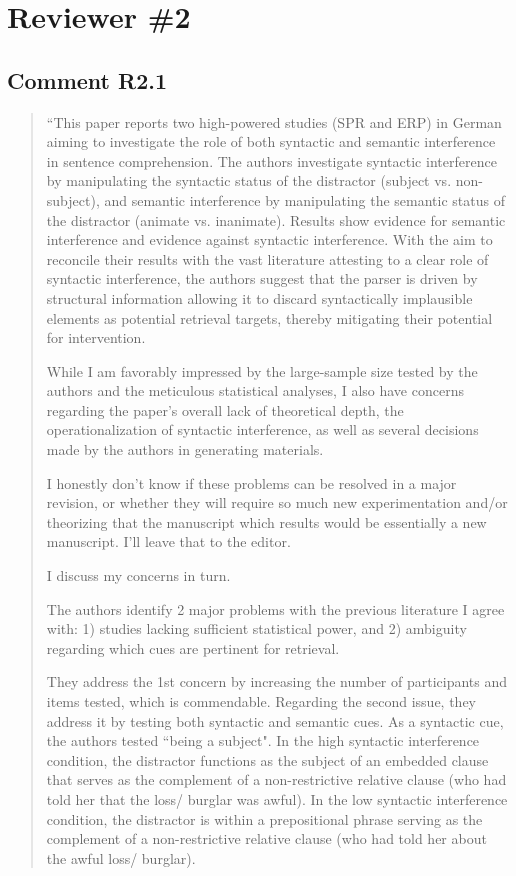 \documentclass[12pt]{article}
\begin{document}
\section*{Reviewer \#2} 
\subsection*{Comment R2.1}
\begin{quote}
``This paper reports two high-powered studies (SPR and ERP) in German aiming to investigate the role of both syntactic and semantic interference in sentence comprehension. The authors investigate syntactic interference by manipulating the syntactic status of the distractor (subject vs. non-subject), and semantic interference by manipulating the semantic status of the distractor (animate vs. inanimate). Results show evidence for semantic interference and evidence against syntactic interference. With the aim to reconcile their results with the vast literature attesting to a clear role of syntactic interference, the authors suggest that the parser is driven by structural information allowing it to discard syntactically implausible elements as potential retrieval targets, thereby mitigating their potential for intervention.

While I am favorably impressed by the large-sample size tested by the authors and the meticulous statistical analyses, I also have concerns regarding the paper's overall lack of theoretical depth, the operationalization of syntactic interference, as well as several decisions made by the authors in generating materials.

I honestly don't know if these problems can be resolved in a major revision, or whether they will require so much new experimentation and/or theorizing that the manuscript which results would be essentially a new manuscript. I'll leave that to the editor.

I discuss my concerns in turn.

The authors identify 2 major problems with the previous literature I agree with: 1) studies lacking sufficient statistical power, and 2) ambiguity regarding which cues are pertinent for retrieval.

They address the 1st concern by increasing the number of participants and items tested, which is commendable. Regarding the second issue, they address it by testing both syntactic and semantic cues. As a syntactic cue, the authors tested ``being a subject". In the high syntactic interference condition, the distractor functions as the subject of an embedded clause that serves as the complement of a non-restrictive relative clause (who had told her that the loss/ burglar was awful). In the low syntactic interference condition, the distractor is within a prepositional phrase serving as the complement of a non-restrictive relative clause (who had told her about the awful loss/ burglar).


\end{quote}
\end{document}
